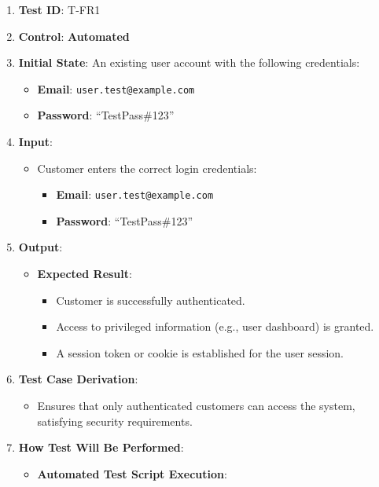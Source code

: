 \documentclass[12pt, titlepage]{article}
\begin{document}
\begin{enumerate}
    \item \textbf{Test ID}: T-FR1
    \item \textbf{Control}: \textbf{Automated}
    \item \textbf{Initial State}: An existing user account with the following credentials:
    \begin{itemize}
        \item \textbf{Email}: \texttt{user.test@example.com}
        \item \textbf{Password}: ``TestPass\#123''
    \end{itemize}
    \item \textbf{Input}:
    \begin{itemize}
        \item Customer enters the correct login credentials:
        \begin{itemize}
            \item \textbf{Email}: \texttt{user.test@example.com}
            \item \textbf{Password}: ``TestPass\#123''
        \end{itemize}
    \end{itemize}
    \item \textbf{Output}:
    \begin{itemize}
        \item \textbf{Expected Result}:
        \begin{itemize}
            \item Customer is successfully authenticated.
            \item Access to privileged information (e.g., user dashboard) is granted.
            \item A session token or cookie is established for the user session.
        \end{itemize}
    \end{itemize}
    \item \textbf{Test Case Derivation}:
    \begin{itemize}
        \item Ensures that only authenticated customers can access the system, satisfying security requirements.
    \end{itemize}
    \item \textbf{How Test Will Be Performed}:
    \begin{itemize}
        \item \textbf{Automated Test Script Execution}:

\end{itemize}
\end{enumerate}
\end{document}
